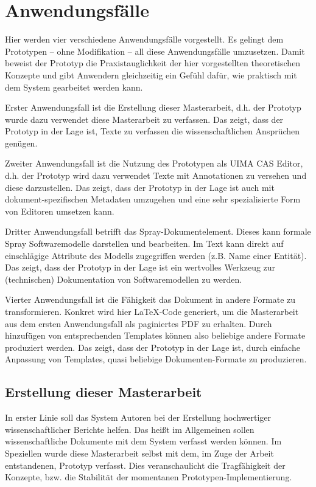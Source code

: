  
\chapter{Anwendungsfälle}\label{}
 
Hier werden vier verschiedene Anwendungsfälle vorgestellt. Es gelingt dem Prototypen -- ohne Modifikation -- all diese Anwendungsfälle umzusetzen. Damit beweist der Prototyp die Praxistauglichkeit der hier vorgestellten theoretischen Konzepte und gibt Anwendern gleichzeitig ein Gefühl dafür, wie praktisch mit dem System gearbeitet werden kann.

 
Erster Anwendungsfall ist die Erstellung dieser Masterarbeit, d.h. der Prototyp wurde dazu verwendet diese Masterarbeit zu verfassen. Das zeigt, dass der Prototyp in der Lage ist, Texte zu verfassen die wissenschaftlichen Ansprüchen genügen.

 
Zweiter Anwendungsfall ist die Nutzung des Prototypen als UIMA CAS Editor, d.h. der Prototyp wird dazu verwendet Texte mit Annotationen zu versehen und diese darzustellen. Das zeigt, dass der Prototyp in der Lage ist auch mit dokument-spezifischen Metadaten umzugehen und eine sehr spezialisierte Form von Editoren umsetzen kann.

 
Dritter Anwendungsfall betrifft das Spray-Dokumentelement. Dieses kann formale Spray Softwaremodelle darstellen und bearbeiten. Im Text kann direkt auf einschlägige Attribute des Modells zugegriffen werden (z.B. Name einer Entität). Das zeigt, dass der Prototyp in der Lage ist ein wertvolles Werkzeug zur (technischen) Dokumentation von Softwaremodellen zu werden.

 
Vierter Anwendungsfall ist die Fähigkeit das Dokument in andere Formate zu transformieren. Konkret wird hier LaTeX-Code generiert, um die Masterarbeit aus dem ersten Anwendungsfall als paginiertes PDF zu erhalten. Durch hinzufügen von entsprechenden Templates können also beliebige andere Formate produziert werden. Das zeigt, dass der Prototyp in der Lage ist, durch einfache Anpassung von Templates, quasi beliebige Dokumenten-Formate zu produzieren.

 
\section{Erstellung dieser Masterarbeit}\label{wiss-dok-abschnitt}
 
In erster Linie soll das System Autoren bei der Erstellung hochwertiger wissenschaftlicher Berichte helfen. Das heißt im Allgemeinen sollen wissenschaftliche Dokumente mit dem System verfasst werden können. Im Speziellen wurde diese Masterarbeit selbst mit dem, im Zuge der Arbeit entstandenen, Prototyp verfasst. Dies veranschaulicht die Tragfähigkeit der Konzepte, bzw. die Stabilität der momentanen Prototypen-Implementierung.


